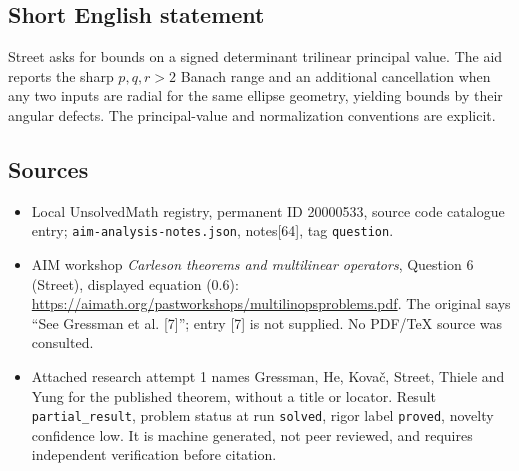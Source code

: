 \documentclass[11pt]{article}
\begin{document}
\subsection{Short English statement}
Street asks for bounds on a signed determinant trilinear principal value. The aid reports the sharp $p,q,r>2$ Banach range and an additional cancellation when any two inputs are radial for the same ellipse geometry, yielding bounds by their angular defects. The principal-value and normalization conventions are explicit.
\subsection{Sources}
\begin{itemize}
\item Local UnsolvedMath registry, permanent ID 20000533, source code catalogue entry; \texttt{aim-analysis-notes.json}, notes[64], tag \texttt{question}.
\item AIM workshop \emph{Carleson theorems and multilinear operators}, Question 6 (Street), displayed equation (0.6): \url{https://aimath.org/pastworkshops/multilinopsproblems.pdf}. The original says ``See Gressman et al. [7]''; entry [7] is not supplied. No PDF/TeX source was consulted.
\item Attached research attempt 1 names Gressman, He, Kovač, Street, Thiele and Yung for the published theorem, without a title or locator. Result \texttt{partial\_result}, problem status at run \texttt{solved}, rigor label \texttt{proved}, novelty confidence low. It is machine generated, not peer reviewed, and requires independent verification before citation.
\end{itemize}
\end{document}
